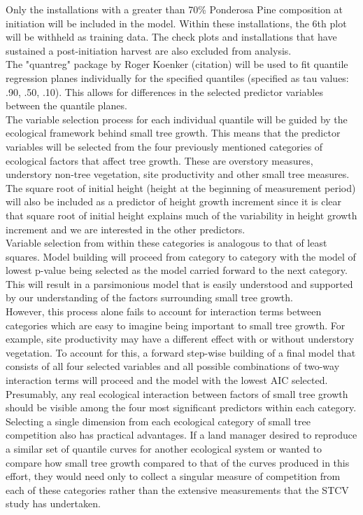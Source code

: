 \documentclass[10pt, letterpaper, fleqn]{article}
\begin{document}
Only the installations with a greater than 70\% Ponderosa Pine composition at initiation will be included in the model.  Within these installations, the 6th plot will be withheld as training data.  The check plots and installations that have sustained a post-initiation harvest are also excluded from analysis.  \\[2pt]
\noindent 
The "quantreg" package by Roger Koenker (citation) will be used to fit quantile regression planes individually for the specified quantiles (specified as tau values: .90, .50, .10).  This allows for differences in the selected predictor variables between the quantile planes.  \\[2pt]
\noindent 
The variable selection process for each individual quantile will be guided by the ecological framework behind small tree growth.  This means that the predictor variables will be selected from the four previously mentioned categories of ecological factors that affect tree growth. These are overstory measures, understory non-tree vegetation, site productivity and other small tree measures.  The square root of initial height (height at the beginning of measurement period) will also be included as a predictor of height growth increment since it is clear that square root of initial height explains much of the variability in height growth increment and we are interested in the other predictors.\\[2pt]
\noindent 
Variable selection from within these categories is analogous to that of least squares.   Model building will proceed from category to category with the model of lowest p-value being selected as the model carried forward to the next category. This will result in a parsimonious model that is easily understood and supported by our understanding of the factors surrounding small tree growth. \\[2pt]
\noindent 
However, this process alone fails to account for interaction terms between categories which are easy to imagine being important to small tree growth. For example, site productivity may have a different effect with or without understory vegetation.  To account for this, a forward step-wise building of a final model that consists of all four selected variables and all possible combinations of two-way interaction terms will proceed and the model with the lowest AIC selected. Presumably, any real ecological interaction between factors of small tree growth should be visible among the four most significant predictors within each category.\\[2pt]
\noindent 
Selecting a single dimension from each ecological category of small tree competition also has practical advantages.  If a land manager desired to reproduce a similar set of quantile curves for another ecological system or wanted to compare how small tree growth compared to that of the curves produced in this effort, they would need only to collect a singular measure of competition from each of these categories rather than the extensive measurements that the STCV study has undertaken.\\[2pt]

\cite{rdct:r} 
\printbibliography
\end{document}

